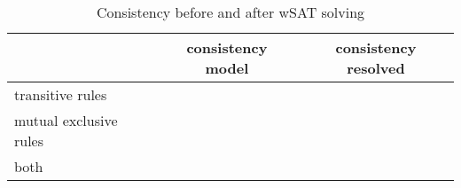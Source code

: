 \begin{table*}
\begin{tabular}{ l|c|c} 
& consistency model & consistency resolved \\\hline
transitive rules & & \\\hline
mutual exclusive rules & & \\\hline
both & & \\\hline
\end{tabular}
\caption{Consistency before and after wSAT solving}
\end{table*}